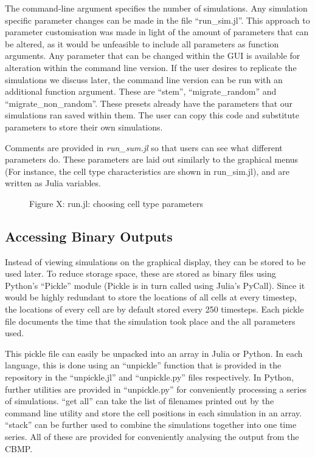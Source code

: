\documentclass[12pt]{article}
\begin{document}
The command-line argument specifies the number of simulations. Any 
simulation specific parameter changes can be made in the file 
``run\_sim.jl''. This approach to parameter customisation was made in 
light of the amount of parameters that can be altered, as it would be 
unfeasible to include all parameters as function arguments. Any 
parameter that can be changed within the GUI is available for alteration 
within the command line version. If the user desires to replicate the 
simulations we discuss later, the command line version can be run with 
an additional function argument. These are ``stem'', ``migrate\_random'' 
and ``migrate\_non\_random''. These presets already have the parameters 
that our simulations ran saved within them. The user can copy this code 
and substitute parameters to store their own simulations.

Comments are provided in {\itshape run\_sum.jl} so that users can see 
what different parameters do. These parameters are laid out similarly to 
the graphical menus (For instance, the cell type characteristics are 
shown in run\_sim.jl), and are written as Julia variables.

\begin{figure}[H]
\centering
\caption[]{Figure X: run.jl: choosing cell type parameters}
\end{figure}

\subsection{Accessing Binary Outputs}
Instead of viewing simulations on the graphical display, they can be 
stored to be used later. To reduce storage space, these are stored as 
binary files using Python's ``Pickle'' module (Pickle is in turn called 
using Julia's PyCall). Since it would be highly redundant to store the 
locations of all cells at every timestep, the locations of every cell 
are by default stored every 250 timesteps. Each pickle file documents 
the time that the simulation took place and the all parameters used.

This pickle file can easily be unpacked into an array in Julia or 
Python. In each language, this is done using an ``unpickle'' function 
that is provided in the repository in the ``unpickle.jl'' and 
``unpickle.py'' files respectively. In Python, further utilities are 
provided in ``unpickle.py'' for conveniently processing a series of 
simulations. ``get all'' can take the list of filenames printed out by 
the command line utility and store the cell positions in each simulation 
in an array. ``stack'' can be further used to combine the simulations 
together into one time series. All of these are provided for 
conveniently analysing the output from the CBMP.
\end{document}
